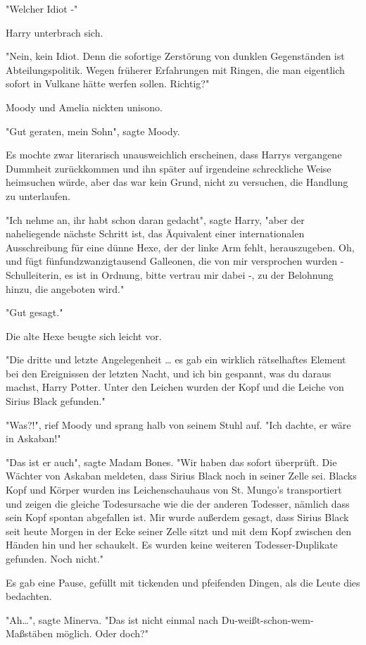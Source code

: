 {"Welcher Idiot -"

Harry unterbrach sich.

"Nein, kein Idiot. Denn die sofortige Zerstörung von dunklen Gegenständen ist Abteilungspolitik. Wegen früherer Erfahrungen mit Ringen, die man eigentlich sofort in Vulkane hätte werfen sollen. Richtig?"

Moody und Amelia nickten unisono.

"Gut geraten, mein Sohn", sagte Moody.

Es mochte zwar literarisch unausweichlich erscheinen, dass Harrys vergangene Dummheit zurückkommen und ihn später auf irgendeine schreckliche Weise heimsuchen würde, aber das war kein Grund, nicht zu versuchen, die Handlung zu unterlaufen.

"Ich nehme an, ihr habt schon daran gedacht", sagte Harry, "aber der naheliegende nächste Schritt ist, das Äquivalent einer internationalen Ausschreibung für eine dünne Hexe, der der linke Arm fehlt, herauszugeben. Oh, und fügt fünfundzwanzigtausend Galleonen, die von mir versprochen wurden - Schulleiterin, es ist in Ordnung, bitte vertrau mir dabei -, zu der Belohnung hinzu, die angeboten wird."

"Gut gesagt."

Die alte Hexe beugte sich leicht vor.

"Die dritte und letzte Angelegenheit … es gab ein wirklich rätselhaftes Element bei den Ereignissen der letzten Nacht, und ich bin gespannt, was du daraus machst, Harry Potter. Unter den Leichen wurden der Kopf und die Leiche von Sirius Black gefunden."

"Was?!", rief Moody und sprang halb von seinem Stuhl auf. "Ich dachte, er wäre in Askaban!"

"Das ist er auch", sagte Madam Bones. "Wir haben das sofort überprüft. Die Wächter von Askaban meldeten, dass Sirius Black noch in seiner Zelle sei. Blacks Kopf und Körper wurden ins Leichenschauhaus von St. Mungo's transportiert und zeigen die gleiche Todesursache wie die der anderen Todesser, nämlich dass sein Kopf spontan abgefallen ist. Mir wurde außerdem gesagt, dass Sirius Black seit heute Morgen in der Ecke seiner Zelle sitzt und mit dem Kopf zwischen den Händen hin und her schaukelt. Es wurden keine weiteren Todesser-Duplikate gefunden. Noch nicht."

Es gab eine Pause, gefüllt mit tickenden und pfeifenden Dingen, als die Leute dies bedachten.

"Ah…", sagte Minerva. "Das ist nicht einmal nach Du-weißt-schon-wem-Maßstäben möglich. Oder doch?"

}
